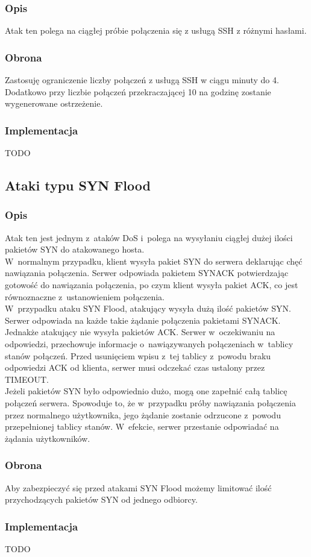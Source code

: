 \documentclass[a4paper,10pt]{article}
\begin{document}
		\subsubsection{Opis}
			Atak ten polega na ciągłej próbie połączenia się z usługą SSH z różnymi hasłami.
		\subsubsection{Obrona}
			Zastosuję ograniczenie liczby połączeń z usługą SSH w ciągu minuty do 4.\\
			Dodatkowo przy liczbie połączeń przekraczającej 10 na godzinę zostanie wygenerowane ostrzeżenie.
		\subsubsection{Implementacja}
			TODO
	\subsection{Ataki typu SYN Flood}
		\subsubsection{Opis}
			Atak ten jest jednym z~ataków DoS i~polega na wysyłaniu ciągłej dużej ilości pakietów SYN do atakowanego hosta.\\
			W~normalnym przypadku, klient wysyła pakiet SYN do serwera deklarując chęć nawiązania połączenia. Serwer odpowiada pakietem SYN\dywiz ACK potwierdzając gotowość do nawiązania połączenia, po czym klient wysyła pakiet ACK, co jest równoznaczne z~ustanowieniem połączenia.\\
			W~przypadku ataku SYN Flood, atakujący wysyła dużą ilość pakietów SYN. Serwer odpowiada na każde takie żądanie połączenia pakietami SYN\dywiz ACK. Jednakże atakujący nie wysyła pakietów ACK. Serwer w~oczekiwaniu na odpowiedzi, przechowuje informacje o~nawiązywanych połączeniach w~tablicy stanów połączeń. Przed usunięciem wpisu z~tej tablicy z~powodu braku odpowiedzi ACK od klienta, serwer musi odczekać czas ustalony przez TIMEOUT.\\
			Jeżeli pakietów SYN było odpowiednio dużo, mogą one zapełnić całą tablicę połączeń serwera. Spowoduje to, że w~przypadku próby nawiązania połączenia przez normalnego użytkownika, jego żądanie zostanie odrzucone z~powodu przepełnionej tablicy stanów. W~efekcie, serwer przestanie odpowiadać na żądania użytkowników.
		\subsubsection{Obrona}
			Aby zabezpieczyć się przed atakami SYN Flood możemy limitować ilość przychodzących pakietów SYN od jednego odbiorcy.
		\subsubsection{Implementacja}
			TODO
\end{document}
